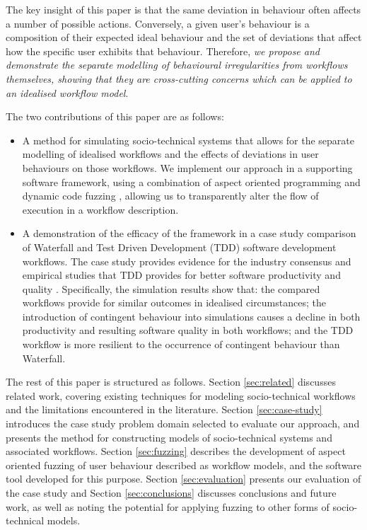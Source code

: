 \documentclass{llncs}
\begin{document}
The key insight of this paper is that the same deviation in behaviour often affects a number of possible actions.
Conversely, a given user's behaviour is a composition of their expected ideal behaviour and the set of deviations that
affect how the specific user exhibits that behaviour.  Therefore, \emph{we propose and demonstrate the separate
modelling of behavioural irregularities from workflows themselves, showing that they are cross-cutting concerns which can
be applied to an idealised workflow model}.

The two contributions of this paper are as follows:

\begin{itemize}

\item A method for simulating socio-technical systems that allows for the separate modelling of idealised workflows and
  the effects of deviations in user behaviours on those workflows.  We implement our approach in a supporting software
  framework, using a combination of aspect oriented programming \cite{filman01aspect} and dynamic code fuzzing
  \citep{takanen08fuzzing}, allowing us to transparently alter the flow of execution in a workflow description.

\item A demonstration of the efficacy of the framework in a case study comparison of Waterfall and Test Driven
  Development (TDD) software development workflows.  The case study provides evidence for the industry consensus and
  empirical studies that TDD provides for better software productivity and quality
  \citep{Bhat2006TestDrivenDevelopment,George2004TestDrivenDevelopment,Huang2009EmpiricalTestFirstProgramming}.
  Specifically, the simulation results show that: the compared workflows provide for similar outcomes in idealised
  circumstances; the introduction of contingent behaviour into simulations causes a decline in both productivity and
  resulting software quality in both workflows; and the TDD workflow is more resilient to the occurrence of contingent
  behaviour than Waterfall.

\end{itemize}

The rest of this paper is structured as follows.  Section \ref{sec:related} discusses related work, covering existing
techniques for modeling socio-technical workflows and the limitations encountered in the literature.  Section
\ref{sec:case-study} introduces the case study problem domain selected to evaluate our approach, and presents the method
for constructing models of socio-technical systems and associated workflows. Section \ref{sec:fuzzing} describes the
development of aspect oriented fuzzing of user behaviour described as workflow models, and the software tool developed
for this purpose.  Section \ref{sec:evaluation} presents our evaluation of the case study and Section
\ref{sec:conclusions} discusses conclusions and future work, as well as noting the potential for applying fuzzing to
other forms of socio-technical models.
\end{document}
